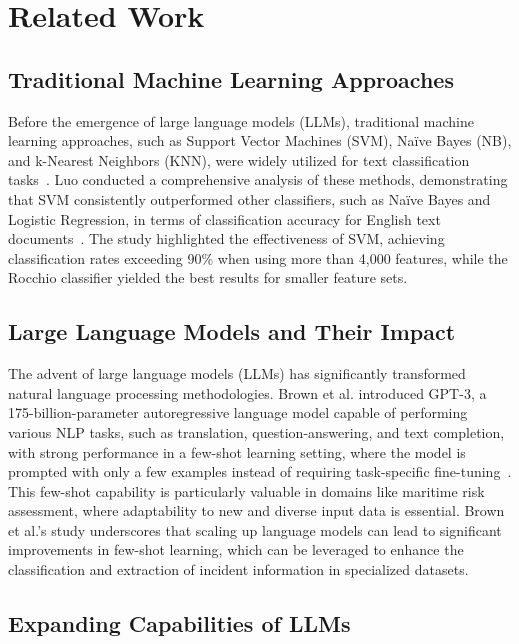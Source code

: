 \section{Related Work}

\subsection{Traditional Machine Learning Approaches}

Before the emergence of large language models (LLMs), traditional machine learning approaches, such as Support Vector Machines (SVM), Na\"ive Bayes (NB), and k-Nearest Neighbors (KNN), were widely utilized for text classification tasks~\cite{chalea}. Luo conducted a comprehensive analysis of these methods, demonstrating that SVM consistently outperformed other classifiers, such as Na\"ive Bayes and Logistic Regression, in terms of classification accuracy for English text documents~\cite{luo2021efficient}. The study highlighted the effectiveness of SVM, achieving classification rates exceeding 90\% when using more than 4,000 features, while the Rocchio classifier yielded the best results for smaller feature sets.

\subsection{Large Language Models and Their Impact}

The advent of large language models (LLMs) has significantly transformed natural language processing methodologies. Brown et al. introduced GPT-3, a 175-billion-parameter autoregressive language model capable of performing various NLP tasks, such as translation, question-answering, and text completion, with strong performance in a few-shot learning setting, where the model is prompted with only a few examples instead of requiring task-specific fine-tuning~\cite{brown2020language}. This few-shot capability is particularly valuable in domains like maritime risk assessment, where adaptability to new and diverse input data is essential. Brown et al.'s study underscores that scaling up language models can lead to significant improvements in few-shot learning, which can be leveraged to enhance the classification and extraction of incident information in specialized datasets.

\subsection{Expanding Capabilities of LLMs}

